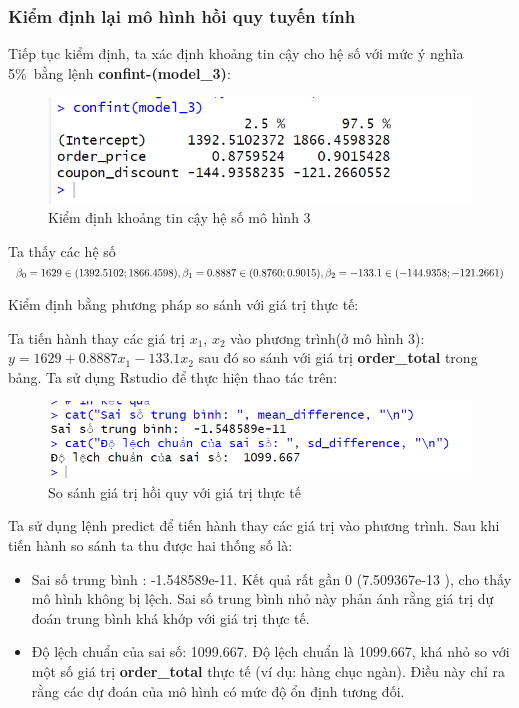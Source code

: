 \subsubsection{Kiểm định lại mô hình hồi quy tuyến tính}
Tiếp tục kiểm định, ta xác định khoảng tin cậy cho hệ số với mức ý nghĩa 5\%\ bằng lệnh \textbf{confint-(model\_3)}:
\begin{figure}[H]
  \centering
  \includegraphics[width=0.7\linewidth]{graphics/5.5.5.png}
  \caption{Kiểm định khoảng tin cậy hệ số mô hình 3 }
\end{figure}

Ta thấy các hệ số $\beta_0= 1629\in(1392.5102; 1866.4598), \beta_1= 0.8887\in(0.8760; 0.9015),\\ \beta_2= -133.1\in(-144.9358; -121.2661)$

Kiểm định bằng phương pháp so sánh với giá trị thực tế:

Ta tiến hành thay các giá trị $x_1$, $x_2$ vào phương trình(ở mô hình 3): $y= 1629 + 0.8887x_1 - 133.1 x_2$ sau đó so sánh với giá trị \textbf{order\_total} trong bảng. Ta sử dụng Rstudio để thực hiện thao tác trên:

\begin{figure}[H]
  \centering
  \includegraphics[width=0.7\linewidth]{graphics/5.5.7.png}
  \caption{So sánh giá trị hồi quy với giá trị thực tế }
\end{figure}

Ta sử dụng lệnh predict để tiến hành thay các giá trị vào phương trình. Sau khi tiến hành so sánh ta thu được hai thống số là:
\begin{itemize}
  \item Sai số trung bình : -1.548589e-11. Kết quả rất gần 0 (7.509367e-13 ), cho thấy mô hình không bị lệch. Sai số trung bình nhỏ này phản ánh rằng giá trị dự đoán trung bình khá khớp với giá trị thực tế.
  \item Độ lệch chuẩn của sai số: 1099.667. Độ lệch chuẩn là 1099.667, khá nhỏ so với một số giá trị \textbf{order\_total} thực tế (ví dụ: hàng chục ngàn). Điều này chỉ ra rằng các dự đoán của mô hình có mức độ ổn định tương đối.
\end{itemize}

